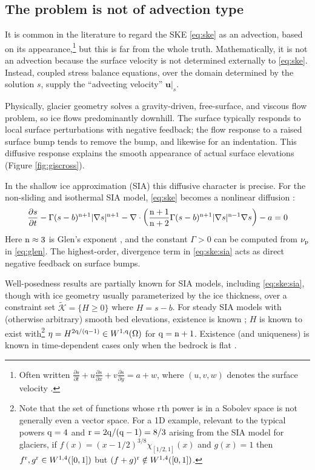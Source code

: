\documentclass[hidelinks,onefignum,onetabnum,final]{siamart220329}  %
\newcommand{\grad}{\nabla}
\newcommand{\Div}{\nabla\cdot}
\newcommand{\bu}{\mathbf{u}}
\newcommand{\cK}{\mathcal{K}}
\newcommand{\nn}{{\text{\textnormal{n}}}}
\newcommand{\pp}{{\text{\textnormal{p}}}}
\newcommand{\qq}{{\text{\textnormal{q}}}}
\newcommand{\rr}{{\text{\textnormal{r}}}}
\begin{document}
\subsection{The problem is not of advection type} \label{subsec:notadv}  It is common in the literature to regard the SKE \eqref{eq:ske} as an advection, based on its appearance,\footnote{Often written $\frac{\partial s}{\partial t} + u \frac{\partial s}{\partial x} + v \frac{\partial s}{\partial y} = a + w$, where $(u,v,w)$ denotes the surface velocity \cite{GreveBlatter2009,SchoofHewitt2013}.} but this is far from the whole truth.  Mathematically, it is not an advection because the surface velocity is not determined externally to \eqref{eq:ske}.  Instead, coupled stress balance equations, over the domain determined by the solution $s$, supply the ``advecting velocity'' $\bu|_s$.

Physically, glacier geometry solves a gravity-driven, free-surface, and viscous flow problem, so ice flows predominantly downhill.  The surface typically responds to local surface perturbations with negative feedback; the flow response to a raised surface bump tends to remove the bump, and likewise for an indentation.  This diffusive response explains the smooth appearance of actual surface elevations (Figure \ref{fig:giscross}).

In the shallow ice approximation (SIA) this diffusive character is precise.  For the non-sliding and isothermal SIA model, \eqref{eq:ske} becomes a nonlinear diffusion \cite{JouvetBueler2012}:
\begin{equation}
\frac{\partial s}{\partial t} - \Gamma (s-b)^{\nn+1} |\grad s|^{\nn+1} - \Div \left(\frac{\nn+1}{\nn+2} \Gamma (s-b)^{\nn+1} |\grad s|^{\nn-1} \grad s\right) - a = 0  \label{eq:ske:sia}
\end{equation}
Here $\nn\approx 3$ is Glen's exponent \cite{GreveBlatter2009}, and the constant $\Gamma>0$ can be computed from $\nu_\pp$ in \eqref{eq:glen}.  The highest-order, divergence term in \eqref{eq:ske:sia} acts as direct negative feedback on surface bumps.

Well-posedness results are partially known for SIA models, including \eqref{eq:ske:sia}, though with ice geometry usually parameterized by the ice thickness, over a constraint set $\tilde{\cK} = \{H\ge 0\}$ where $H=s-b$.   For steady SIA models with (otherwise arbitrary) smooth bed elevations, existence is known \cite{JouvetBueler2012}; $H$ is known to exist with\footnote{Note that the set of functions whose $\rr$th power is in a Sobolev space is not generally even a vector space.  For a 1D example, relevant to the typical powers $\qq=4$ and $\rr=2\qq/(\qq-1)=8/3$ arising from the SIA model for glaciers, if $f(x)=(x-1/2)^{3/8} \chi_{[1/2,1]}(x)$ and $g(x)=1$ then $f^\rr,g^\rr \in W^{1,4}([0,1])$ but $(f+g)^\rr\notin W^{1,4}([0,1])$.} $\eta = H^{2\qq/(\qq-1)} \in W^{1,\qq}(\Omega)$ for $\qq=\nn+1$.  Existence (and uniqueness) is known in time-dependent cases only when the bedrock is flat \cite{Calvoetal2003,PiersantiTemam2023}.
\end{document}
